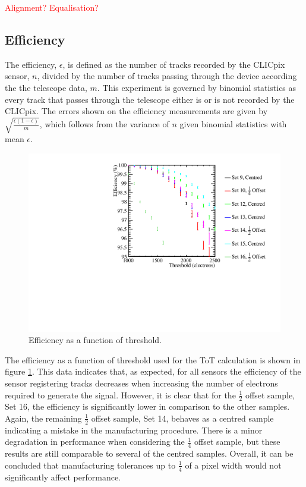 \textcolor{red}{Alignment?}
\textcolor{red}{Equalisation?}


\subsection{Efficiency}
The efficiency, $\epsilon$, is defined as the number of tracks recorded by the CLICpix sensor, $n$, divided by the number of tracks passing through the device according the the telescope data, $m$.  This experiment is governed by binomial statistics as every track that passes through the telescope either is or is not recorded by the CLICpix.  The errors shown on the efficiency measurements are given by $\sqrt{\frac{\epsilon (1 - \epsilon)}{m}}$, which follows from the variance of $n$ given binomial statistics with mean $\epsilon$.  

\begin{figure}
\centering
\includegraphics[width=1.0\textwidth]{CLICdpVertex/Plots/TestBeamData/EfficiencyThresholdPlot.pdf}
\caption[Efficiency as a function of threshold.]{Efficiency as a function of threshold.}
\label{fig:efficiency}
\end{figure}

The efficiency as a function of threshold used for the ToT calculation is shown in figure \ref{fig:efficiency}.  This data indicates that, as expected, for all sensors the efficiency of the sensor registering tracks decreases when increasing the number of electrons required to generate the signal.  However, it is clear that for the $\frac{1}{2}$ offset sample, Set 16, the efficiency is significantly lower in comparison to the other samples.  Again, the remaining $\frac{1}{2}$ offset sample, Set 14, behaves as a centred sample indicating a mistake in the manufacturing procedure.  There is a minor degradation in performance when considering the $\frac{1}{4}$ offset sample, but these results are still comparable to several of the centred samples.  Overall, it can be concluded that manufacturing tolerances up to $\frac{1}{4}$ of a pixel width would not significantly affect performance.    


